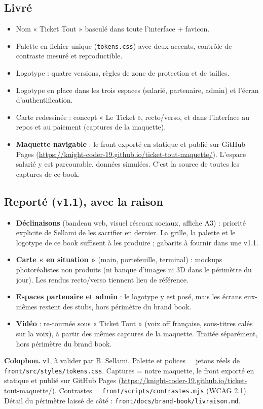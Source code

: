 \documentclass[11pt,a4paper]{article}
\newcommand{\code}[1]{\texttt{\small #1}}
\newcommand{\maquetteurl}{https://knight-coder-19.github.io/ticket-tout-maquette/}
\begin{document}
\subsection{Livré}
\begin{itemize}
  \item Nom « Ticket Tout » basculé dans toute l'interface + favicon.
  \item Palette en fichier unique (\code{tokens.css}) avec deux accents,
        contrôle de contraste mesuré et reproductible.
  \item Logotype : quatre versions, règles de zone de protection et de tailles.
  \item Logotype en place dans les trois espaces (salarié, partenaire, admin)
        et l'écran d'authentification.
  \item Carte redessinée : concept « Le Ticket », recto/verso, et dans
        l'interface au repos et au paiement (captures de la maquette).
  \item \textbf{Maquette navigable} : le front exporté en statique et publié sur
        GitHub Pages (\url{\maquetteurl}). L'espace salarié y est parcourable,
        données simulées. C'est la source de toutes les captures de ce book.
\end{itemize}

\subsection{Reporté (v1.1), avec la raison}
\begin{itemize}
  \item \textbf{Déclinaisons} (bandeau web, visuel réseaux sociaux, affiche
        A3) : priorité explicite de Sellami de les sacrifier en dernier. La
        grille, la palette et le logotype de ce book suffisent à les produire ;
        gabarits à fournir dans une v1.1.
  \item \textbf{Carte « en situation »} (main, portefeuille, terminal) :
        mockups photoréalistes non produits (ni banque d'images ni 3D dans le
        périmètre du jour). Les rendus recto/verso tiennent lieu de référence.
  \item \textbf{Espaces partenaire et admin} : le logotype y est posé, mais les
        écrans eux-mêmes restent des stubs, hors périmètre du brand book.
  \item \textbf{Vidéo} : re-tournée sous « Ticket Tout » (voix off française,
        sous-titres calés sur la voix), à partir des mêmes captures de la
        maquette. Traitée séparément, hors périmètre du brand book.
\end{itemize}

\vfill
\begin{bloc}
\textbf{Colophon.} v1, à valider par B. Sellami. Palette et polices = jetons
réels de \code{front/src/styles/tokens.css}. Captures = notre maquette, le front
exporté en statique et publié sur GitHub Pages (\url{\maquetteurl}). Contrastes
= \code{front/scripts/contrastes.mjs} (WCAG 2.1). Détail du périmètre laissé de
côté : \code{front/docs/brand-book/livraison.md}.
\end{bloc}
\end{document}

